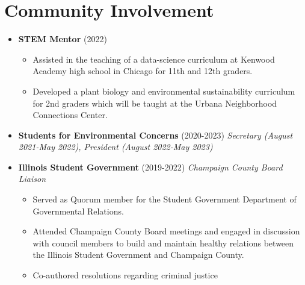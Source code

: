 \section*{Community Involvement}
\begin{itemize}
  \item \textbf{STEM Mentor} (2022)
    \begin{itemize}
      \item Assisted in the teaching of a data-science curriculum at Kenwood Academy high school in Chicago for 11th and 12th graders.
      \item Developed a plant biology and environmental sustainability curriculum for 2nd graders which will be taught at the Urbana Neighborhood Connections Center.
    \end{itemize}
  \item \textbf{Students for Environmental Concerns} (2020-2023)
    \textit{Secretary (August 2021-May 2022), President (August 2022-May 2023)}
  \item \textbf{Illinois Student Government} (2019-2022)
    \textit{Champaign County Board Liaison}
    \begin{itemize}
      \item Served as Quorum member for the Student Government Department of Governmental Relations.
      \item Attended Champaign County Board meetings and engaged in discussion with council members to build and maintain healthy relations between the Illinois Student Government and Champaign County.
      \item Co-authored resolutions regarding criminal justice
    \end{itemize}
\end{itemize}
